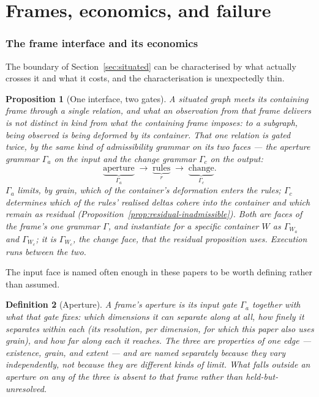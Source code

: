 \documentclass[11pt,a4paper]{article}
\newtheorem{definition}{Definition}[section]
\newtheorem{proposition}[definition]{Proposition}
\theoremstyle{remark}\newtheorem{remark}[definition]{Remark}
\begin{document}
\part{Frames, economics, and failure}
\section{The frame interface and its economics}\label{sec:interface}

The boundary of Section~\ref{sec:situated} can be characterised by what actually crosses it and what it costs, and the characterisation is unexpectedly thin.

\begin{proposition}[One interface, two gates]\label{prop:two-gates}
A situated graph meets its containing frame through a single relation, and what an observation from that frame delivers is not distinct in kind from what the containing frame imposes: to a subgraph, being observed \emph{is} being deformed by its container. That one relation is gated twice, by the same kind of admissibility grammar on its two faces --- the \emph{aperture grammar} $\Gamma_a$ on the input and the \emph{change grammar} $\Gamma_c$ on the output:
\[
\boxed{\underbrace{\text{aperture}}_{\Gamma_a}\;\longrightarrow\;\underbrace{\text{rules}}_{r}\;\longrightarrow\;\underbrace{\text{change}}_{\Gamma_c}.}
\]
$\Gamma_a$ limits, by grain, which of the container's deformation enters the rules; $\Gamma_c$ determines which of the rules' realised deltas cohere into the container and which remain as residual (Proposition~\ref{prop:residual-inadmissible}). Both are faces of the frame's one grammar $\Gamma$, and instantiate for a specific container $W$ as $\Gamma_{W_a}$ and $\Gamma_{W_c}$; it is $\Gamma_{W_c}$, the change face, that the residual proposition uses. Execution runs between the two.
\end{proposition}

The input face is named often enough in these papers to be worth defining rather than assumed.

\begin{definition}[Aperture]\label{def:aperture}
A frame's \emph{aperture} is its input gate $\Gamma_a$ together with what that gate fixes: which
dimensions it can separate along at all, how finely it separates within each (its resolution,
per dimension, for which this paper also uses \emph{grain}), and how far along each it reaches. The three are properties of one edge --- existence,
grain, and extent --- and are named separately because they vary independently, not because they are
different kinds of limit. What falls outside an aperture on any of the three is \emph{absent} to that
frame rather than held-but-unresolved.
\end{definition}
\end{document}
